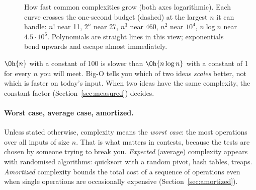 \begin{figure}[htbp]
\centering
{}
\caption{How fast common complexities grow (both axes logarithmic). Each curve crosses the one-second budget (dashed) at the
largest $n$ it can handle: $n!$ near 11, $2^n$ near 27, $n^3$ near 460, $n^2$ near $10^4$, $n\log n$ near $4.5\cdot10^6$.
Polynomials are straight lines in this view; exponentials bend upwards and escape almost immediately.}
\label{fig:growth}
\end{figure}

\begin{pitfall}
$\Oh{n}$ with a constant of 100 is slower than $\Oh{n \log n}$ with a constant of 1 for every $n$ you will meet. Big-O tells
you which of two ideas \emph{scales} better, not which is faster on today's input. When two ideas have the same complexity,
the constant factor (Section~\ref{sec:measured}) decides.
\end{pitfall}

\paragraph{Worst case, average case, amortized.} Unless stated otherwise, complexity means the \emph{worst case}: the most
operations over all inputs of size $n$. That is what matters in contests, because the tests are chosen by someone trying to
break you. \emph{Expected} (average) complexity appears with randomised algorithms: quicksort with a random pivot, hash
tables, treaps. \emph{Amortized} complexity bounds the total cost of a sequence of operations even when single operations
are occasionally expensive (Section~\ref{sec:amortized}).

